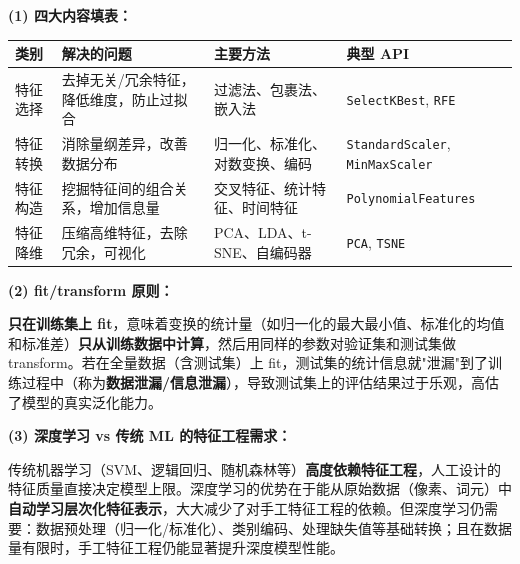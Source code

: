 \documentclass[a4paper,11pt]{ctexart}
\begin{document}
\begin{solutionbox}[参考答案与详细解析]
    \textbf{(1) 四大内容填表：}
    \begin{center}
    \begin{tabular}{p{2.5cm} p{3.5cm} p{3.5cm} p{3cm}}
        \toprule
        类别 & 解决的问题 & 主要方法 & 典型 API \\
        \midrule
        特征选择 & 去掉无关/冗余特征，降低维度，防止过拟合 & 过滤法、包裹法、嵌入法 & \texttt{SelectKBest}, \texttt{RFE} \\[0.8em]
        特征转换 & 消除量纲差异，改善数据分布 & 归一化、标准化、对数变换、编码 & \texttt{StandardScaler}, \texttt{MinMaxScaler} \\[0.8em]
        特征构造 & 挖掘特征间的组合关系，增加信息量 & 交叉特征、统计特征、时间特征 & \texttt{PolynomialFeatures} \\[0.8em]
        特征降维 & 压缩高维特征，去除冗余，可视化 & PCA、LDA、t-SNE、自编码器 & \texttt{PCA}, \texttt{TSNE} \\
        \bottomrule
    \end{tabular}
    \end{center}

    \textbf{(2) fit/transform 原则：}

    \textbf{只在训练集上 fit}，意味着变换的统计量（如归一化的最大最小值、标准化的均值和标准差）\textbf{只从训练数据中计算}，然后用同样的参数对验证集和测试集做 transform。若在全量数据（含测试集）上 fit，测试集的统计信息就"泄漏"到了训练过程中（称为\textbf{数据泄漏/信息泄漏}），导致测试集上的评估结果过于乐观，高估了模型的真实泛化能力。

    \textbf{(3) 深度学习 vs 传统 ML 的特征工程需求：}

    传统机器学习（SVM、逻辑回归、随机森林等）\textbf{高度依赖特征工程}，人工设计的特征质量直接决定模型上限。深度学习的优势在于能从原始数据（像素、词元）中\textbf{自动学习层次化特征表示}，大大减少了对手工特征工程的依赖。但深度学习仍需要：数据预处理（归一化/标准化）、类别编码、处理缺失值等基础转换；且在数据量有限时，手工特征工程仍能显著提升深度模型性能。
\end{solutionbox}
\end{document}
